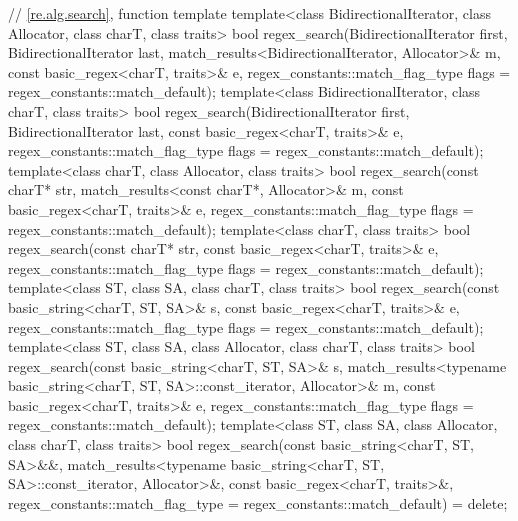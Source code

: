 \begin{codeblock}
{  // \ref{re.alg.search}, function template 
  template<class BidirectionalIterator, class Allocator, class charT, class traits>
    bool regex_search(BidirectionalIterator first, BidirectionalIterator last,
                      match_results<BidirectionalIterator, Allocator>& m,
                      const basic_regex<charT, traits>& e,
                      regex_constants::match_flag_type flags = regex_constants::match_default);
  template<class BidirectionalIterator, class charT, class traits>
    bool regex_search(BidirectionalIterator first, BidirectionalIterator last,
                      const basic_regex<charT, traits>& e,
                      regex_constants::match_flag_type flags = regex_constants::match_default);
  template<class charT, class Allocator, class traits>
    bool regex_search(const charT* str,
                      match_results<const charT*, Allocator>& m,
                      const basic_regex<charT, traits>& e,
                      regex_constants::match_flag_type flags = regex_constants::match_default);
  template<class charT, class traits>
    bool regex_search(const charT* str,
                      const basic_regex<charT, traits>& e,
                      regex_constants::match_flag_type flags = regex_constants::match_default);
  template<class ST, class SA, class charT, class traits>
    bool regex_search(const basic_string<charT, ST, SA>& s,
                      const basic_regex<charT, traits>& e,
                      regex_constants::match_flag_type flags = regex_constants::match_default);
  template<class ST, class SA, class Allocator, class charT, class traits>
    bool regex_search(const basic_string<charT, ST, SA>& s,
                      match_results<typename basic_string<charT, ST, SA>::const_iterator,
                                    Allocator>& m,
                      const basic_regex<charT, traits>& e,
                      regex_constants::match_flag_type flags = regex_constants::match_default);
  template<class ST, class SA, class Allocator, class charT, class traits>
    bool regex_search(const basic_string<charT, ST, SA>&&,
                      match_results<typename basic_string<charT, ST, SA>::const_iterator,
                                    Allocator>&,
                      const basic_regex<charT, traits>&,
                      regex_constants::match_flag_type
                        = regex_constants::match_default) = delete;

}
\end{codeblock}
